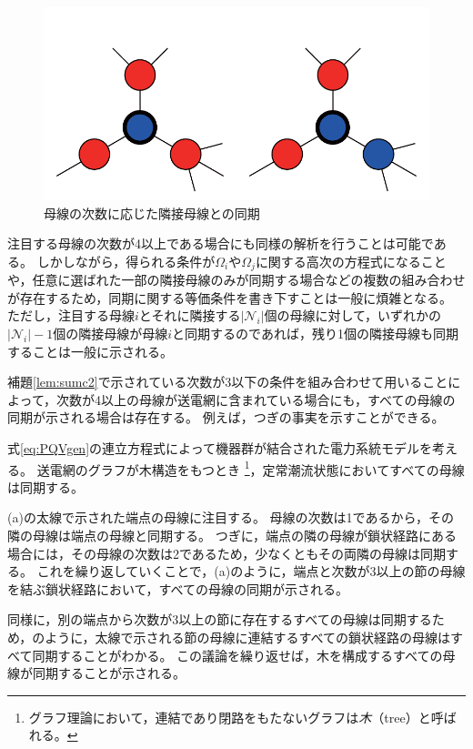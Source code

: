 \documentclass[tombow,dvipdfmx]{corona-a5-1.1}
\begin{document}
\begin{figure}[t]
{\begin{minipage}{0.3\linewidth}
  \end{minipage}
  \label{fig:N2}
  \begin{minipage}{0.3\linewidth}
    \centering
    \includegraphics[width = .60\linewidth]{figs/3degbus}
  \end{minipage}
  \medskip
  \caption{母線の次数に応じた隣接母線との同期}
  \label{fig:bussync}
  }
\medskip
\end{figure}
注目する母線の次数が4以上である場合にも同様の解析を行うことは可能である。
しかしながら，得られる条件が$\Omega_i$や$\Omega_j$に関する高次の方程式になることや，任意に選ばれた一部の隣接母線のみが同期する場合などの複数の組み合わせが存在するため，同期に関する等価条件を書き下すことは一般に煩雑となる。
ただし，注目する母線$i$とそれに隣接する$|\mathcal{N}_i|$個の母線に対して，いずれかの$|\mathcal{N}_i |-1$個の隣接母線が母線$i$と同期するのであれば，残り1個の隣接母線も同期することは一般に示される。

補題\ref{lem:sumc2}で示されている次数が3以下の条件を組み合わせて用いることによって，次数が4以上の母線が送電網に含まれている場合にも，すべての母線の同期が示される場合は存在する。
例えば，つぎの事実を示すことができる。

\begin{定理}[木構造の送電網における母線の同期]
\label{thm:tree}
式\ref{eq:PQVgen}の連立方程式によって機器群が結合された電力系統モデルを考える。
送電網のグラフが木構造をもつとき
\footnote{
グラフ理論において，連結であり閉路をもたないグラフは\emph{木}（tree）と呼ばれる。
}，定常潮流状態においてすべての母線は同期する。
\end{定理}

\begin{証明}
(a)の太線で示された端点の母線に注目する。
母線の次数は1であるから，その隣の母線は端点の母線と同期する。
つぎに，端点の隣の母線が鎖状経路にある場合には，その母線の次数は2であるため，少なくともその両隣の母線は同期する。
これを繰り返していくことで，(a)のように，端点と次数が3以上の節の母線を結ぶ鎖状経路において，すべての母線の同期が示される。

同様に，別の端点から次数が3以上の節に存在するすべての母線は同期するため，のように，太線で示される節の母線に連結するすべての鎖状経路の母線はすべて同期することがわかる。
この議論を繰り返せば，木を構成するすべての母線が同期することが示される。
\end{証明}
\end{document}
